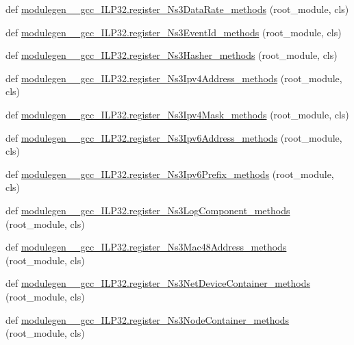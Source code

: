 \begin{DoxyCompactItemize}
def \hyperlink{namespacemodulegen____gcc__ILP32_a4eb2f9b3d4be750ab50fb46f1e494ed7}{modulegen\+\_\+\+\_\+gcc\+\_\+\+I\+L\+P32.\+register\+\_\+\+Ns3\+Data\+Rate\+\_\+methods} (root\+\_\+module, cls)
\item 
def \hyperlink{namespacemodulegen____gcc__ILP32_a380e15c15390ba7c3f21a3162cb67911}{modulegen\+\_\+\+\_\+gcc\+\_\+\+I\+L\+P32.\+register\+\_\+\+Ns3\+Event\+Id\+\_\+methods} (root\+\_\+module, cls)
\item 
def \hyperlink{namespacemodulegen____gcc__ILP32_a33425c5d69b8b6e93c725709f6aa95fb}{modulegen\+\_\+\+\_\+gcc\+\_\+\+I\+L\+P32.\+register\+\_\+\+Ns3\+Hasher\+\_\+methods} (root\+\_\+module, cls)
\item 
def \hyperlink{namespacemodulegen____gcc__ILP32_a3a069cad6e59687195ff869fd35923d3}{modulegen\+\_\+\+\_\+gcc\+\_\+\+I\+L\+P32.\+register\+\_\+\+Ns3\+Ipv4\+Address\+\_\+methods} (root\+\_\+module, cls)
\item 
def \hyperlink{namespacemodulegen____gcc__ILP32_a4f3623d807ca57aa642b7e9d784b1747}{modulegen\+\_\+\+\_\+gcc\+\_\+\+I\+L\+P32.\+register\+\_\+\+Ns3\+Ipv4\+Mask\+\_\+methods} (root\+\_\+module, cls)
\item 
def \hyperlink{namespacemodulegen____gcc__ILP32_acc57372433d228dd060a3165e8c17c71}{modulegen\+\_\+\+\_\+gcc\+\_\+\+I\+L\+P32.\+register\+\_\+\+Ns3\+Ipv6\+Address\+\_\+methods} (root\+\_\+module, cls)
\item 
def \hyperlink{namespacemodulegen____gcc__ILP32_aa8595c3a98eeb16457cb2bea21656ecd}{modulegen\+\_\+\+\_\+gcc\+\_\+\+I\+L\+P32.\+register\+\_\+\+Ns3\+Ipv6\+Prefix\+\_\+methods} (root\+\_\+module, cls)
\item 
def \hyperlink{namespacemodulegen____gcc__ILP32_acb065c4c8dd650290d45041beef3c1d9}{modulegen\+\_\+\+\_\+gcc\+\_\+\+I\+L\+P32.\+register\+\_\+\+Ns3\+Log\+Component\+\_\+methods} (root\+\_\+module, cls)
\item 
def \hyperlink{namespacemodulegen____gcc__ILP32_a8e21fcb75de80cc6b1cd32abe7cfdd36}{modulegen\+\_\+\+\_\+gcc\+\_\+\+I\+L\+P32.\+register\+\_\+\+Ns3\+Mac48\+Address\+\_\+methods} (root\+\_\+module, cls)
\item 
def \hyperlink{namespacemodulegen____gcc__ILP32_aa9b79a6cfb60163ed439b9298fb5c7d7}{modulegen\+\_\+\+\_\+gcc\+\_\+\+I\+L\+P32.\+register\+\_\+\+Ns3\+Net\+Device\+Container\+\_\+methods} (root\+\_\+module, cls)
\item 
def \hyperlink{namespacemodulegen____gcc__ILP32_a29b309b6bee1fe59273ea5b33c29fde1}{modulegen\+\_\+\+\_\+gcc\+\_\+\+I\+L\+P32.\+register\+\_\+\+Ns3\+Node\+Container\+\_\+methods} (root\+\_\+module, cls)

\end{DoxyCompactItemize}
